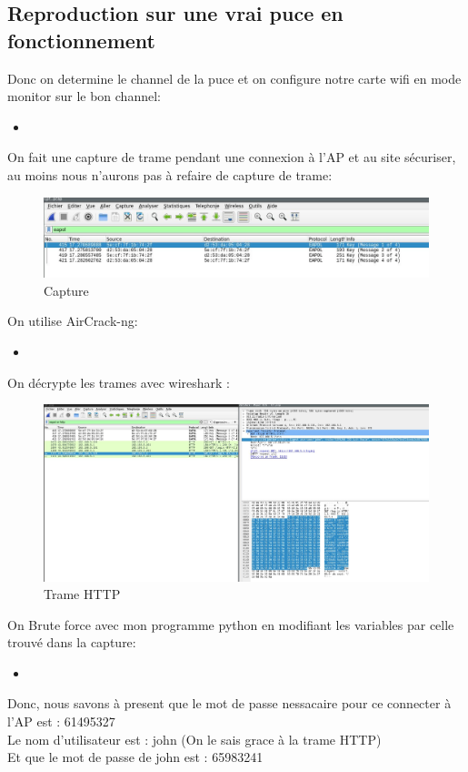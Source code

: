 \documentclass[10pt,a4paper]{article}
\newcommand{\insertcode}[2]{\begin{itemize}\item[]\end{itemize}}
\begin{document}
\subsection{Reproduction sur une vrai puce en fonctionnement}
Donc on determine le channel de la puce et on configure notre carte wifi en mode monitor sur le bon channel:
\insertcode{code/puce/1}{Setup}
On fait une capture de trame pendant une connexion à l'AP et au site sécuriser, au moins nous n'aurons pas à refaire de capture de trame:
\begin{figure}[h!]
\centering
\includegraphics[scale=0.500]{image/8.jpg}
\caption{Capture}
\label{fig:net }
\end{figure}
On utilise AirCrack-ng:
\insertcode{code/puce/2}{AirCrack}
On décrypte les trames avec wireshark :
\begin{figure}[h!]
\centering
\includegraphics[scale=0.250]{image/9.jpg}
\caption{Trame HTTP}
\label{fig:net }
\end{figure}
On Brute force avec mon programme python en modifiant les variables par celle trouvé dans la capture:
\insertcode{manip/puce/digest_authAP2.py}{Le code est 65983241}
Donc, nous savons à present que le mot de passe nessacaire pour ce connecter à l'AP est : 61495327\\
Le nom d'utilisateur est : john (On le sais grace à la trame HTTP)\\
Et que le mot de passe de john est : 65983241 \\
\end{document}
